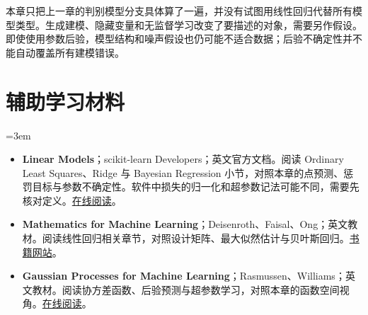 本章只把上一章的判别模型分支具体算了一遍，并没有试图用线性回归代替所有模型类型。生成建模、隐藏变量和无监督学习改变了要描述的对象，需要另作假设。即使使用参数后验，模型结构和噪声假设也仍可能不适合数据；后验不确定性并不能自动覆盖所有建模错误。

\section*{辅助学习材料}
\begingroup
\emergencystretch=3em
\begin{itemize}
 \item \textbf{Linear Models}；scikit-learn Developers；英文官方文档。阅读 Ordinary Least Squares、Ridge 与 Bayesian Regression 小节，对照本章的点预测、惩罚目标与参数不确定性。软件中损失的归一化和超参数记法可能不同，需要先核对定义。\href{https://scikit-learn.org/stable/modules/linear\_model.html}{在线阅读}。
 \item \textbf{Mathematics for Machine Learning}；Deisenroth、Faisal、Ong；英文教材。阅读线性回归相关章节，对照设计矩阵、最大似然估计与贝叶斯回归。\href{https://mml-book.com}{书籍网站}。
 \item \textbf{Gaussian Processes for Machine Learning}；Rasmussen、Williams；英文教材。阅读协方差函数、后验预测与超参数学习，对照本章的函数空间视角。\href{https://gaussianprocess.org/gpml/}{在线阅读}。
\end{itemize}
\endgroup

